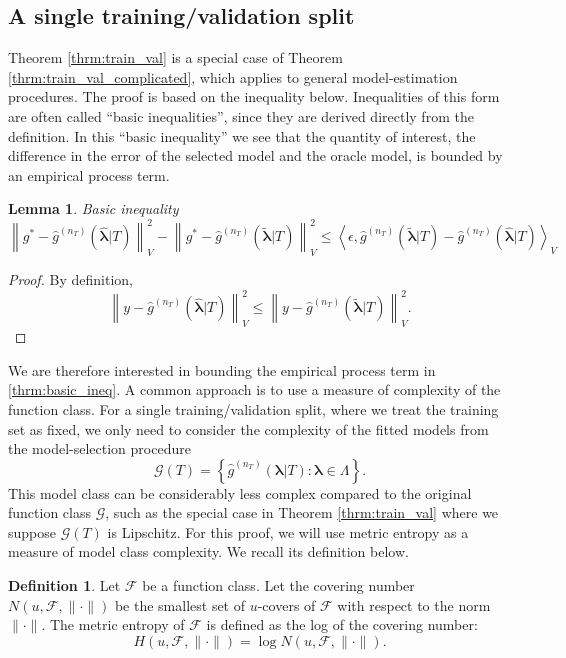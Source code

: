 \documentclass[10pt]{book}
\newtheorem{lemma}{Lemma}
\theoremstyle{definition}
\newtheorem{definition}{Definition}
\begin{document}
\subsection{A single training/validation split}
\label{appendix:train_val}

Theorem \ref{thrm:train_val} is a special case of Theorem \ref{thrm:train_val_complicated}, which applies to general model-estimation procedures. The proof is based on the inequality below. Inequalities of this form are often called ``basic inequalities'', since they are derived directly from the definition. In this ``basic inequality'' we see that the quantity of interest, the difference in the error of the selected model and the oracle model, is bounded by an empirical process term.

\begin{lemma}{Basic inequality}
	\begin{equation}
	\label{thrm:basic_ineq}
	\left \| g^* - \hat{g}^{(n_T)}(\hat{\boldsymbol{\lambda}}|T) \right \|^2_V 
	- \left \| g^* - \hat{g}^{(n_T)}(\tilde{\boldsymbol{\lambda}}|T) \right \|^2_V
	\le 
	\left \langle \epsilon, \hat{g}^{(n_T)}(\tilde{\boldsymbol{\lambda}}|T) - \hat{g}^{(n_T)}(\hat{\boldsymbol{\lambda}}|T) \right \rangle_V
	\end{equation}
\end{lemma}

\begin{proof}
	By definition,
	\begin{equation}
	\left \| y - \hat{g}^{(n_T)}(\hat{\boldsymbol{\lambda}}|T) \right \|^2_V \le 
	\left \| y - \hat{g}^{(n_T)}(\tilde{\boldsymbol{\lambda}}|T) \right \|^2_V.
	\end{equation}
\end{proof}

We are therefore interested in bounding the empirical process term in \eqref{thrm:basic_ineq}. A common approach is to use a measure of complexity of the function class. For a single training/validation split, where we treat the training set as fixed, we only need to consider the complexity of the fitted models from the model-selection procedure
\begin{equation}
\mathcal{G}(T)=\left\{ \hat{g}^{(n_T)}(\boldsymbol{\lambda}|T) : \boldsymbol{\lambda} \in \Lambda \right\}.
\end{equation}
This model class can be considerably less complex compared to the original function class $\mathcal{G}$, such as the special case in Theorem \ref{thrm:train_val} where we suppose $\mathcal{G}(T)$ is Lipschitz. For this proof, we will use metric entropy as a measure of model class complexity. We recall its definition below.
\begin{definition}
	Let $\mathcal{F}$ be a function class. Let the covering number $N(u, \mathcal{F}, \| \cdot \|)$ be the smallest set of $u$-covers of $\mathcal{F}$ with respect to the norm $\| \cdot \|$. The metric entropy of $\mathcal{F}$ is defined as the log of the covering number:
	\begin{equation}
	H (u, \mathcal{F}, \| \cdot \| ) = \log N(u, \mathcal{F}, \| \cdot \|).
	\end{equation}
\end{definition}
\end{document}
